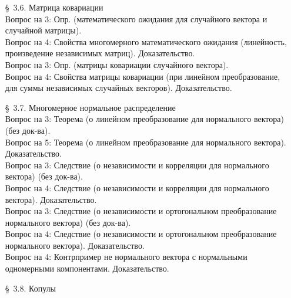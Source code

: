 \documentclass[10pt]{amsart}
\begin{document}
\begin{enumerate}
\begin{enumerate}
       
        

\item[\S\, 3.6.] Матрица ковариации \\
Вопрос на 3: Опр. (математического ожидания для случайного вектора и случайной матрицы). \\
Вопрос на 4: Свойства многомерного математического ожидания (линейность, произведение независимых матриц). Доказательство. \\ 
Вопрос на 3: Опр. (матрицы ковариации случайного вектора). \\
Вопрос на 4: Свойства матрицы ковариации (при линейном преобразование, для суммы независимых случайных векторов). Доказательство. \\


\item[\S\, 3.7.] Многомерное нормальное распределение \\

Вопрос на 3: Теорема (о линейном преобразование для нормального вектора) (без док-ва). \\
Вопрос на 5: Теорема (о линейном преобразование для нормального вектора). Доказательство. \\
Вопрос на 3: Следствие (о независимости и корреляции для нормального вектора) (без док-ва). \\ 
Вопрос на 4: Следствие (о независимости и корреляции для нормального вектора). Доказательство. \\ 
Вопрос на 3: Следствие (о независимости и  ортогональном преобразование нормального вектора) (без док-ва). \\ 
Вопрос на 4: Следствие (о независимости и  ортогональном преобразование нормального вектора). Доказательство. \\ 
Вопрос на 4: Контрпример не нормального вектора с нормальными одномерными компонентами. Доказательство. \\ 

\item[\S\, 3.8.] Копулы \\
        

\end{enumerate}
\end{enumerate}
\end{document}
